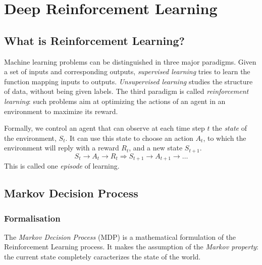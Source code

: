 \section{Deep Reinforcement Learning}
\subsection{What is Reinforcement Learning?}
Machine learning problems can be distinguished in three major paradigms. Given a set of inputs and corresponding outputs, \emph{supervised learning} tries to learn the function mapping inputs to outputs. \emph{Unsupervised learning} studies the structure of data, without being given labels. The third paradigm is called \emph{reinforcement learning}: such problems aim at optimizing the actions of an agent in an environment to maximize its reward.

Formally, we control an agent that can observe at each time step $t$ the \emph{state} of the environment, $S_t$. It can use this state to choose an action $A_t$, to which the environment will reply with a reward $R_t$, and a new state $S_{t+1}$.
\begin{equation*}
    S_t\longrightarrow A_t\longrightarrow R_t \Longrightarrow S_{t+1}\longrightarrow A_{t+1} \longrightarrow \dots
\end{equation*}
This is called one \emph{episode} of learning.

\subsection{Markov Decision Process}
\subsubsection{Formalisation}
The \emph{Markov Decision Process} (MDP) is a mathematical formulation of the Reinforcement Learning process. It makes the assumption of the \emph{Markov property}: the current state completely caracterizes the state of the world.

